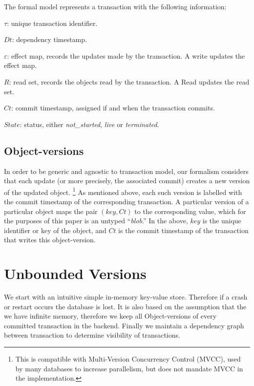 \documentclass[systeme,french,english]{compas2022}
\begin{document}
The formal model represents a transaction with the following information:
\begin{compactitem}
\item $\tau$: unique transaction identifier.
\item $\mathit{Dt}$: dependency timestamp.
\item {$\varepsilon$}: effect map, records the updates made by the
  transaction.
  A write updates the effect map.
\item ${R}$: read set, records the objects read by the transaction.
  A Read updates the read set.
\item $\mathit{Ct}$: commit timestamp, assigned if and when the
  transaction commits.
\item $\mathit{State}$: status, either \emph{not\_started}, \emph{live} or \emph{terminated}.\\
\end{compactitem}



\subsection{Object-versions}

In order to be generic and agnostic to transaction model, our formalism
considers that each update (or more precisely, the associated commit)
creates a new version of the updated object.%
%
\footnote{
%
  This is compatible with Multi-Version Concurrency Control (MVCC), used
  by many databases to increase parallelism, but does not mandate MVCC
  in the implementation.
}
%
As mentioned above, each such version is labelled with the commit
timestamp of the corresponding transaction.
A particular version of a particular object maps the pair
$(\mathit{key},\mathit{Ct})$ to the corresponding value, which for the
purposes of this paper is an untyped ``\emph{blob}.''
In the above, $\mathit{key}$ is the unique identifier or key of the
object, and $\mathit{Ct}$ is the commit timestamp of the transaction
that writes this object-version.


\section{Unbounded Versions}

We start with an intuitive simple in-memory key-value store.
Therefore if a crash or restart occurs the database is lost.
It is also based on the assumption that the we have infinite memory, therefore we keep all Object-versions of every committed transaction in the backend.
Finally we maintain a dependency graph between transaction to determine visibility of transactions.
\end{document}
